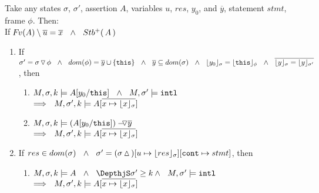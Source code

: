 {\begin{lemma}
\label{l:calls}
Take any states $\sigma$, $\sigma'$, assertion $A$, %
variables  $u$, $res$, $y_0$, and  $\overline{y}$, statement $stmt$, frame $\phi$. Then: %
\\
If 
 $\fv(A)\setminus{\overline{u}} =\overline{x}\ \ \wedge \ \  \Pos A$
  
\begin{enumerate}
\item
If $\sigma'=\sigma  \pushSymbol \phi \ \ \wedge \ \  dom(\phi)=\overline{y}\cup \{ \prg{this} \}\ \ \wedge\ \ 
\overline{y} \subseteq dom(\sigma)\ \  \wedge\ \
\interpret \sigma {y_0} = \interpret \phi {\prg{this}}\ \ \wedge \ \ 
\overline{ {\interpret \sigma y}= {\interpret {\sigma'} y}}$,  then
\begin{enumerate}
\item
$\satDAssertFrom M  \sigma k   A[y_0/\prg{this}] \ \    \wedge\ \ M, \sigma' \models \intThis 
$\\
$\Longrightarrow\ \  \satDAssertFrom M  {\sigma'} k   A[\overline {x \mapsto {\interpret \sigma x}}]$
\item
$\satDAssertFrom M  \sigma k   {\PushAS  {y} {( A[y_0/\prg{this}])}}$\\  
$\Longrightarrow\ \  \satDAssertFrom M  {\sigma'} k   A[\overline {x \mapsto {\interpret \sigma x}}]$

\end{enumerate}
\item
If $res \in dom(\sigma)\ \  \wedge\ \  \sigma'= (\sigma \popSymbol)[u \mapsto {\interpret {\sigma} {res}}][\prg{cont}\mapsto stmt]$, then
\begin{enumerate}
\item
$\satDAssertFrom M  \sigma k   A \ \ \wedge\ \ \DepthjS \sigma' \geq k  \wedge\ \ M, \sigma' \models \intThis $ \\
$\Longrightarrow\ \  \satDAssertFrom M  {\sigma'} k   A[\overline {x \mapsto {\interpret \sigma x}}]$

 \end{enumerate}
\end{enumerate}


\end{lemma}}
